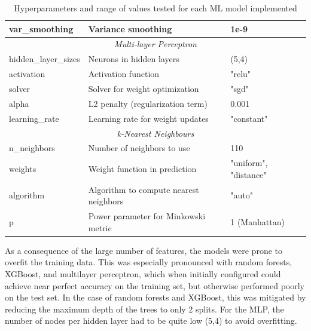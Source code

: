 \begin{table}[h]
\begin{adjustbox}{center}
\begin{tabular}{|l|l|l|}
			\hline
			var\_smoothing & Variance smoothing & 1e-9 \\
			\hline
			\multicolumn{3}{|c|}{\rule{0pt}{2.5ex}\textit{Multi-layer Perceptron}} \\
			\hline
			hidden\_layer\_sizes & Neurons in hidden layers & (5,4) \\
			activation & Activation function & "relu" \\
			solver & Solver for weight optimization & "sgd" \\
			alpha & L2 penalty (regularization term) & 0.001 \\
			learning\_rate & Learning rate for weight updates & "constant" \\
			\hline
			\multicolumn{3}{|c|}{\rule{0pt}{2.5ex}\textit{k-Nearest Neighbours}} \\
			\hline
			n\_neighbors & Number of neighbors to use & 110 \\
			weights & Weight function in prediction & "uniform", "distance" \\
			algorithm & Algorithm to compute nearest neighbors & "auto" \\
			p & Power parameter for Minkowski metric & 1 (Manhattan) \\
			\hline
		\end{tabular}
	\end{adjustbox}
	
	\caption{Hyperparameters and range of values tested for each ML model implemented}
	\label{table:hyperparameters2}
\end{table}


As a consequence of the large number of features, the models were prone to overfit the training data. This was especially pronounced with random forests, XGBoost, and multilayer perceptron, which when initially configured could achieve near perfect accuracy on the training set, but otherwise performed poorly on the test set. In the case of random forests and XGBoost, this was mitigated by reducing the maximum depth of the trees to only 2 splits. For the MLP, the number of nodes per hidden layer had to be quite low (5,4) to avoid overfitting.

